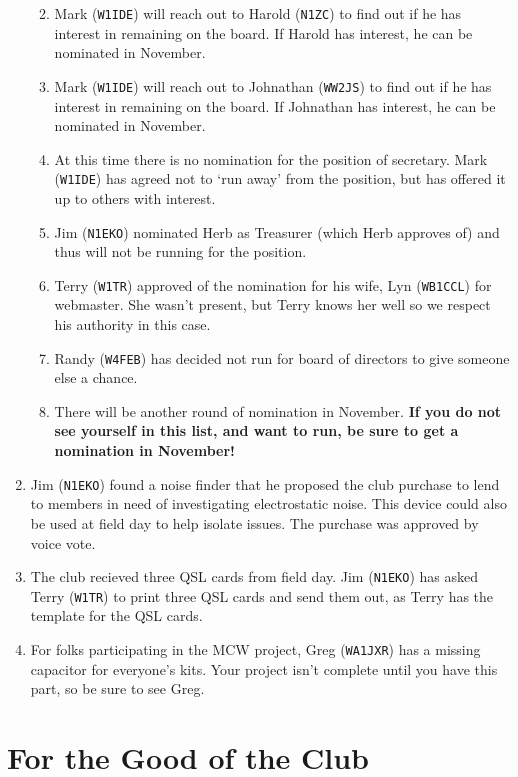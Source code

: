 \documentclass[10pt,letterpaper]{article}
\begin{document}
\begin{enumerate}
\begin{enumerate}
\begin{tabular}{|l|l|l|}
    \end{tabular}
    \item Mark (\texttt{W1IDE}) will reach out to Harold (\texttt{N1ZC}) to find out if he has interest in remaining on the board. If Harold has interest, he can be nominated in November.
    \item Mark (\texttt{W1IDE}) will reach out to Johnathan (\texttt{WW2JS}) to find out if he has interest in remaining on the board. If Johnathan has interest, he can be nominated in November.
    \item At this time there is no nomination for the position of secretary. Mark (\texttt{W1IDE}) has agreed not to `run away' from the position, but has offered it up to others with interest.
    \item Jim (\texttt{N1EKO}) nominated Herb as Treasurer (which Herb approves of) and thus will not be running for the position.
    \item Terry (\texttt{W1TR}) approved of the nomination for his wife, Lyn (\texttt{WB1CCL}) for webmaster. She wasn't present, but Terry knows her well so we respect his authority in this case.
    \item Randy (\texttt{W4FEB}) has decided not run for board of directors to give someone else a chance.
    \item There will be another round of nomination in November. \textbf{If you do not see yourself in this list, and want to run, be sure to get a nomination in November!}
  \end{enumerate}

  \item Jim (\texttt{N1EKO}) found a noise finder that he proposed the club purchase to lend to members in need of investigating electrostatic noise. This device could also be used at field day to help isolate issues. The purchase was approved by voice vote.
  \item The club recieved three QSL cards from field day. Jim (\texttt{N1EKO}) has asked Terry (\texttt{W1TR}) to print three QSL cards and send them out, as Terry has the template for the QSL cards.
  \item For folks participating in the MCW project, Greg (\texttt{WA1JXR}) has a missing capacitor for everyone's kits. Your project isn't complete until you have this part, so be sure to see Greg.
\end{enumerate}

\section{For the Good of the Club}
\end{document}

